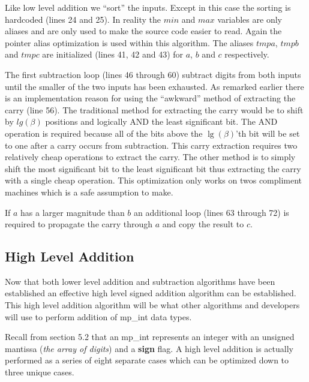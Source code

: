 \documentclass[b5paper]{book}
\begin{document}
Like low level addition we ``sort'' the inputs.  Except in this case the sorting is hardcoded 
(lines 24 and 25).  In reality the $min$ and $max$ variables are only aliases and are only 
used to make the source code easier to read.  Again the pointer alias optimization is used 
within this algorithm.  The aliases $tmpa$, $tmpb$ and $tmpc$ are initialized
(lines 41, 42 and 43) for $a$, $b$ and $c$ respectively.

The first subtraction loop (lines 46 through 60) subtract digits from both inputs until the smaller of
the two inputs has been exhausted.  As remarked earlier there is an implementation reason for using the ``awkward'' 
method of extracting the carry (line 56).  The traditional method for extracting the carry would be to shift 
by $lg(\beta)$ positions and logically AND the least significant bit.  The AND operation is required because all of 
the bits above the $\lg(\beta)$'th bit will be set to one after a carry occurs from subtraction.  This carry 
extraction requires two relatively cheap operations to extract the carry.  The other method is to simply shift the 
most significant bit to the least significant bit thus extracting the carry with a single cheap operation.  This 
optimization only works on twos compliment machines which is a safe assumption to make.

If $a$ has a larger magnitude than $b$ an additional loop (lines 63 through 72) is required to propagate 
the carry through $a$ and copy the result to $c$.  

\subsection{High Level Addition}
Now that both lower level addition and subtraction algorithms have been established an effective high level signed addition algorithm can be
established.  This high level addition algorithm will be what other algorithms and developers will use to perform addition of mp\_int data 
types.  

Recall from section 5.2 that an mp\_int represents an integer with an unsigned mantissa (\textit{the array of digits}) and a \textbf{sign} 
flag.  A high level addition is actually performed as a series of eight separate cases which can be optimized down to three unique cases.
\end{document}
